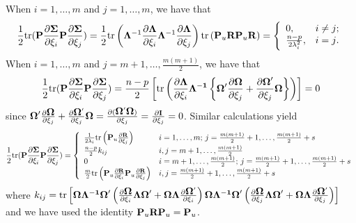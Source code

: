 \documentclass[12pt]{article}
\def\bOmega{\mbox{\boldmath$\Omega$}}
\begin{document}
When $i=1,\ldots,m$ and $j=1,\ldots,m$, we have that
\[ \frac{1}{2}\text{tr}(\mathbf{P}\frac{\partial\mathbf{\Sigma}}{\partial\xi_{i}}\mathbf{P}\frac{\partial\mathbf{\Sigma}}{\partial\xi_{j}})
   = \frac{1}{2}\text{tr}\left(\mathbf{\Lambda}^{-1}\frac{\partial\mathbf{\Lambda}}{\partial\xi_{i}}
   \mathbf{\Lambda}^{-1}\frac{\partial\mathbf{\Lambda}}{\partial\xi_{j}}\right)\text{tr}\left( {\bf P}_u{\bf R}{\bf P}_u{\bf R} \right)
  =\left\{
     \begin{array}{ll}
       0, & \hbox{$i\neq j$;} \\
       \frac{n-p}{2\lambda_{i}^2}, & \hbox{$i=j$.}
     \end{array}
   \right.
\]
When $i=1,\ldots,m$ and $j=m+1,\ldots,\frac{m(m+1)}{2}$, we have that
\[ \frac{1}{2}\text{tr}(\mathbf{P}\frac{\partial\mathbf{\Sigma}}{\partial\xi_{i}}\mathbf{P}\frac{\partial\mathbf{\Sigma}}{\partial\xi_{j}})
    = \frac{n-p}{2}\left[\text{tr}\left(\frac{\partial\mathbf{\Lambda}}{\partial\xi_{i}}\mathbf{\Lambda^{-1}}
    \left\{\bOmega'\frac{\partial\bOmega}{\partial\xi_{j}}+\frac{\partial\bOmega'}{\partial\xi_{j}}\bOmega\right\}\right)\right]=0
\]
since $\bOmega'\frac{\partial\bOmega}{\partial\xi_{j}}+\frac{\partial\bOmega'}{\partial\xi_{j}}\bOmega
  =\frac{\partial(\bOmega'\bOmega)}{\partial\xi_j}=\frac{\partial \mathbf{I}}{\partial\xi_{j}}=0$.
Similar calculations yield
\[ \frac{1}{2}\text{tr}(\mathbf{P}\frac{\partial\mathbf{\Sigma}}{\partial\xi_{i}}\mathbf{P}\frac{\partial\mathbf{\Sigma}}{\partial\xi_{j}})
     = \left\{ \begin{array}{ll} \frac{1}{2\lambda_{i}}\text{tr}\left({\bf P}_u\frac{\partial
     \mathbf{R}}{\partial\xi_{j}}\right) & i=1,\ldots,m; \, j=\frac{m(m+1)}{2}+1,\ldots,\frac{m(m+1)}{2}+s \\
\frac{n-p}{2}k_{ij} & i,j=m+1,\ldots,\frac{m(m+1)}{2} \\
0 & i=m+1,\ldots,\frac{m(m+1)}{2}; \, j=\frac{m(m+1)}{2}+1,\ldots,\frac{m(m+1)}{2}+s \\
\frac{m}{2}\text{tr}\left(\mathbf{P}_{u}\frac{\partial
\mathbf{R}}{\partial\xi_{i}}\mathbf{P}_{u}\frac{\partial
\mathbf{R}}{\partial\xi_{j}}\right) & i,j=\frac{m(m+1)}{2}+1,\ldots,\frac{m(m+1)}{2}+s
\end{array}\right.
\]
where $k_{ij}=\text{tr}\left[\bOmega\mathbf{\Lambda^{-1}}\bOmega'\left(\frac{\partial\bOmega}{\partial\xi_{i}}\mathbf{\Lambda}\bOmega'+
  \bOmega\mathbf{\Lambda}\frac{\partial\bOmega'}{\partial\xi_{i}}\right)\bOmega\mathbf{\Lambda^{-1}}\bOmega'\left(\frac{\partial\bOmega}{\partial\xi_{j}}\mathbf{\Lambda}\bOmega'+
  \bOmega\mathbf{\Lambda}\frac{\partial\bOmega'}{\partial\xi_{j}}\right)\right]$ and we have used the identity ${\bf P}_u{\bf RP}_u={\bf P}_u$.
\end{document}

